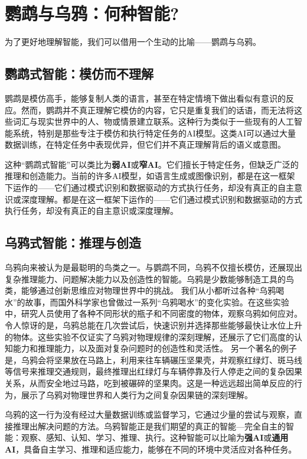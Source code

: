 \section{鹦鹉与乌鸦：何种智能?}

为了更好地理解智能，我们可以借用一个生动的比喻——鹦鹉与乌鸦。

\subsection*{鹦鹉式智能：模仿而不理解}
鹦鹉是模仿高手，能够复制人类的语言，甚至在特定情境下做出看似有意识的反应。然而，鹦鹉并不真正理解它模仿的内容，它只是重复我们的话语，而无法将这些词汇与现实世界中的人、物或情景建立联系。这种行为类似于一些现有的人工智能系统，特别是那些专注于模仿和执行特定任务的AI模型。这类AI可以通过大量数据训练，在特定任务中表现优异，但它们并不真正理解背后的语义或意图。

这种“鹦鹉式智能”可以类比为{\bf 弱AI}或{\bf 窄AI}。它们擅长于特定任务，但缺乏广泛的推理和创造能力。当前的许多AI模型，如语言生成或图像识别，都是在这一框架下运作的——它们通过模式识别和数据驱动的方式执行任务，却没有真正的自主意识或深度理解。都是在这一框架下运作的——它们通过模式识别和数据驱动的方式执行任务，却没有真正的自主意识或深度理解。

\subsection*{乌鸦式智能：推理与创造}

乌鸦向来被认为是最聪明的鸟类之一。与鹦鹉不同，乌鸦不仅擅长模仿，还展现出复杂推理能力、问题解决能力以及创造性的智能。乌鸦是少数能够制造工具的鸟类，能够通过创新思维应对物理世界中的挑战。
我们从小都听过各种“乌鸦喝水”的故事，而国外科学家也曾做过一系列“乌鸦喝水”的变化实验。在这些实验中，研究人员使用了各种不同形状的瓶子和不同密度的物体，观察乌鸦如何应对。令人惊讶的是，乌鸦总能在几次尝试后，快速识别并选择那些能够最快让水位上升的物体。这些实验不仅证实了乌鸦对物理规律的深刻理解，还展示了它们高度的认知能力和推理能力，以及面对复杂问题时的创造性和灵活性。
另一个著名的例子是，乌鸦会将坚果放在马路上，利用来往车辆碾压坚果壳，并观察红绿灯、斑马线等信号来推理交通规则，最终推理出红绿灯与车辆停靠及行人停走之间的复杂因果关系，从而安全地过马路，吃到被碾碎的坚果肉。这是一种远远超出简单反应的行为，展示了乌鸦对物理世界和人类行为之间复杂因果链的深刻理解。

乌鸦的这一行为没有经过大量数据训练或监督学习，它通过少量的尝试与观察，直接推理出解决问题的方法。乌鸦智能正是我们期望的真正的智能---完全自主的智能：观察、感知、认知、学习、推理、执行。这种智能可以比喻为{\bf 强AI}或{\bf 通用AI}，具备自主学习、推理和适应能力，能够在不同的环境中灵活应对各种任务。

